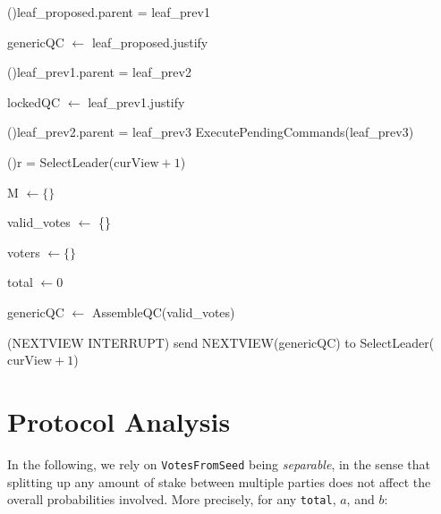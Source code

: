 \documentclass[11pt, oneside]{article}       %
\begin{document}
\begin{algorithm}[H]
{{            \If(){leaf\_proposed.parent = leaf\_prev1}{%
                genericQC \(\leftarrow\) leaf\_proposed.justify

                \If(){leaf\_prev1.parent = leaf\_prev2}{%
                    lockedQC \(\leftarrow\) leaf\_prev1.justify

                    \If(){leaf\_prev2.parent =
                    leaf\_prev3}{%
                        ExecutePendingCommands(leaf\_prev3)
                    }
                }
            }
        }

        \If(){r =
        SelectLeader(\(\text{curView}+1\))}{%
            M \(\leftarrow \{\}\)

            valid\_votes \(\leftarrow\) \{\}

            voters \(\leftarrow \{\}\)

            total \(\leftarrow 0\)


            genericQC \(\leftarrow\) AssembleQC(valid\_votes)

        }

        \Begin(NEXTVIEW INTERRUPT){%
            send NEXTVIEW(genericQC) to SelectLeader(\(\text{curView} +
            1\))
        }
    }

\end{algorithm}

\section{Protocol Analysis}

In the following, we rely on \texttt{VotesFromSeed} being \emph{separable}, in
the sense that splitting up any amount of stake between multiple parties
does not affect the overall probabilities involved. More precisely, for any
\texttt{total}, \(a\), and \(b\):
\end{document}
